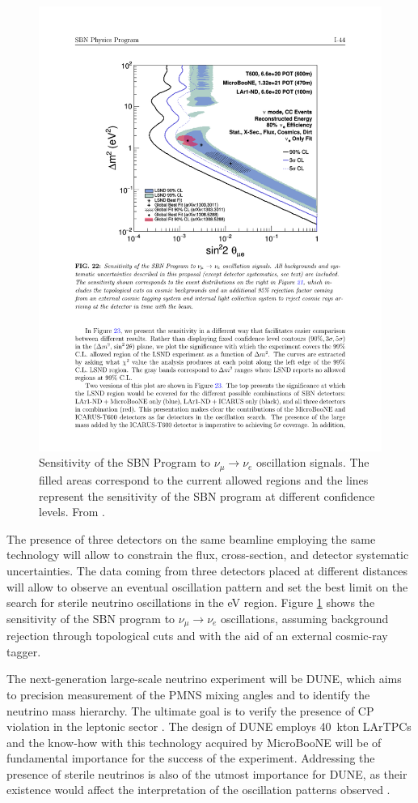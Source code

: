 \begin{figure}[htbp]
    \centering
    \includegraphics[width=0.75\linewidth]{figures/sbn_sensitivity.pdf}
    \caption{Sensitivity of the SBN Program to $\nu_{\mu}\rightarrow\nu_e$ oscillation signals. The filled areas correspond to the current allowed regions and the lines represent the sensitivity of the SBN program at different confidence levels. From \cite{Antonello:2015lea}.}
    \label{fig:sbn_sensitivity}
\end{figure}

The presence of three detectors on the same beamline employing the same technology will allow to constrain the flux, cross-section, and detector systematic uncertainties. The data coming from three detectors placed at different distances will allow to observe an eventual oscillation pattern and set the best limit on the search for sterile neutrino oscillations in the eV region. Figure \ref{fig:sbn_sensitivity} shows the sensitivity of the SBN program to $\nu_{\mu}\rightarrow\nu_e$ oscillations, assuming background rejection through topological cuts and with the aid of an external cosmic-ray tagger. 

The next-generation large-scale neutrino experiment will be DUNE, which aims to precision measurement of the PMNS mixing angles and to identify the neutrino mass hierarchy. The ultimate goal is to verify the presence of CP violation in the leptonic sector \cite{Acciarri:2015uup}. The design of DUNE employs 40~kton LArTPCs and the know-how with this technology acquired by MicroBooNE will be of fundamental importance for the success of the experiment.
Addressing the presence of sterile neutrinos is also of the utmost importance for DUNE, as their existence would affect the interpretation of the oscillation patterns observed \cite{Gandhi:2015xza}.